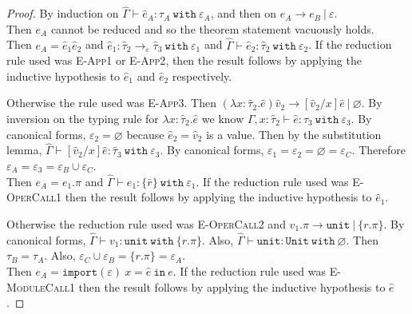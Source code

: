 \documentclass{llncs}
\newcommand{\keywadj}[1]{\mathtt{#1}}
\newcommand{\keyw}[1]{\keywadj{#1}~}
\newcommand{\kw}[1]{\keyw{ #1 }}
\newcommand{\kwa}[1]{\keywadj{ #1 }}
\newcommand{\module}[0]{
\kwa{import}(\varepsilon)~x = \hat e~\kwa{in}~e
}
\begin{document}
\begin{proof}
By induction on $\hat \Gamma \vdash \hat e_A: \tau_A~\kw{with }\varepsilon_A$, and then on $e_A \longrightarrow e_B~|~\varepsilon$. \\

\noindent
{} Then $e_A$ cannot be reduced and so the theorem statement vacuously holds. \\

\noindent
{}
Then $e_A = \hat e_1 \hat e_2$ and $\hat e_1: \hat \tau_2 \rightarrow_{\varepsilon} \hat \tau_3~\kw{with} \varepsilon_1$ and $\hat \Gamma \vdash \hat e_2: \hat \tau_2~\kw{with} \varepsilon_2$. If the reduction rule used was \textsc{E-App1} or \textsc{E-App2}, then the result follows by applying the inductive hypothesis to $\hat e_1$ and $\hat e_2$ respectively.

Otherwise the rule used was \textsc{E-App3}. Then $(\lambda x: \hat \tau_2.\hat e)\hat v_2 \longrightarrow [\hat v_2/x]\hat e~|~\varnothing$. By inversion on the typing rule for $\lambda x: \hat \tau_2.\hat e$ we know $\Gamma, x: \hat \tau_2 \vdash \hat e: \hat \tau_3~\kw{with} \varepsilon_3$. By canonical forms, $\varepsilon_2 = \varnothing$ because $\hat e_2 = \hat v_2$ is a value. Then by the substitution lemma, $\hat \Gamma \vdash [\hat v_2/x]\hat e : \hat \tau_3~\kw{with} \varepsilon_3$. By canonical forms, $\varepsilon_1 = \varepsilon_2 = \varnothing = \varepsilon_C$. Therefore $\varepsilon_A = \varepsilon_3 = \varepsilon_B \cup \varepsilon_C$.\\

\noindent
{}
Then $e_A = e_1.\pi$ and $\hat \Gamma \vdash e_1 : \{ \bar r \}~\kw{with} \varepsilon_1$. If the reduction rule used was \textsc{E-OperCall1} then the result follows by applying the inductive hypothesis to $\hat e_1$.

Otherwise the reduction rule used was \textsc{E-OperCall2} and $v_1.\pi \longrightarrow \kwa{unit}~|~\{ r.\pi \}$. By canonical forms, $\hat \Gamma \vdash v_1: \kwa{unit}~\kw{with} \{ r.\pi \}$. Also, $\hat \Gamma \vdash \kwa{unit}: \kwa{Unit}~\kw{with} \varnothing$. Then $\tau_B = \tau_A$. Also, $\varepsilon_C \cup \varepsilon_B = \{ r.\pi \} = \varepsilon_A$.\\

\noindent
{}
Then $e_A = \module$. If the reduction rule used was \textsc{E-ModuleCall1} then the result follows by applying the inductive hypothesis to $\hat e$.


\end{proof}
\end{document}

